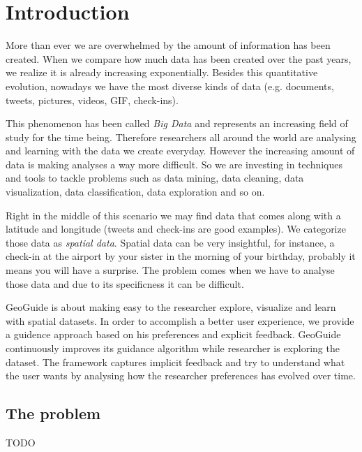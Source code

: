 \chapter{Introduction}
\label{chap:intro}

More than ever we are overwhelmed by the amount of information has been created.
When we compare how much data has been created over the past years, we realize
it is already increasing exponentially.
Besides this quantitative evolution, nowadays
we have the most diverse kinds of data
(e.g. documents, tweets, pictures, videos, GIF, check-ins).

This phenomenon has been called \textit{Big Data} and represents an increasing field of study
for the time being. Therefore researchers all around the world
are analysing and learning with the data we create everyday.
However the increasing amount of data is making analyses a way more difficult.
So we are investing in techniques and tools to tackle problems such as data mining, data cleaning,
data visualization, data classification, data exploration and so on.

Right in the middle of this scenario we may find data that comes along with a latitude and longitude
(tweets and check-ins are good examples). We categorize those data as \textit{spatial data}.
Spatial data can be very insightful, for instance, a check-in at the airport by your sister
in the morning of your birthday, probably it means you will have a surprise.
The problem comes when we have to analyse those data and due to its specificness it can
be difficult. %

GeoGuide is about making easy to the researcher explore, visualize and learn with spatial datasets.
In order to accomplish a better user experience, we provide a guidence approach based
on his preferences and explicit feedback.
GeoGuide continuously improves its guidance algorithm while
researcher is exploring the dataset. The framework captures implicit feedback
and try to understand what the user wants by analysing how the
researcher preferences has evolved over time.


\section{The problem}

TODO

